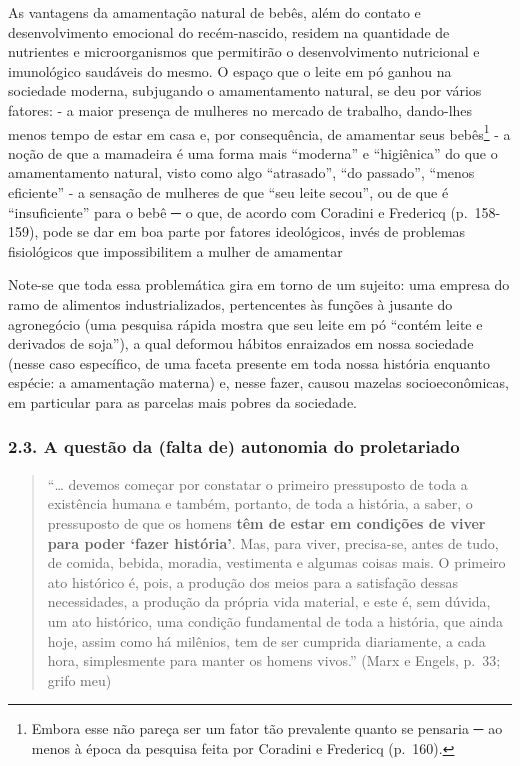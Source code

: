 \documentclass[12pt]{article}
\numberwithin{equation}{section}
\theoremstyle{plain}
\theoremstyle{definition}
\theoremstyle{remark}
\begin{document}
As vantagens da amamentação natural de bebês, além do contato e desenvolvimento emocional do recém-nascido, residem na quantidade de nutrientes e microorganismos que permitirão o desenvolvimento nutricional e imunológico saudáveis do mesmo. O espaço que o leite em pó ganhou na sociedade moderna, subjugando o amamentamento natural, se deu por vários fatores: - a maior presença de mulheres no mercado de trabalho, dando-lhes menos tempo de estar em casa e, por consequência, de amamentar seus bebês\footnote{Embora esse não pareça ser um fator tão prevalente quanto se pensaria ─ ao menos à época da pesquisa feita por Coradini e Fredericq (p.~160).} - a noção de que a mamadeira é uma forma mais ``moderna'' e ``higiênica'' do que o amamentamento natural, visto como algo ``atrasado'', ``do passado'', ``menos eficiente'' - a sensação de mulheres de que ``seu leite secou'', ou de que é ``insuficiente'' para o bebê ─ o que, de acordo com Coradini e Fredericq (p.~158-159), pode se dar em boa parte por fatores ideológicos, invés de problemas fisiológicos que impossibilitem a mulher de amamentar

Note-se que toda essa problemática gira em torno de um sujeito: uma empresa do ramo de alimentos industrializados, pertencentes às funções à jusante do agronegócio (uma pesquisa rápida mostra que seu leite em pó ``contém leite e derivados de soja''), a qual deformou hábitos enraizados em nossa sociedade (nesse caso específico, de uma faceta presente em toda nossa história enquanto espécie: a amamentação materna) e, nesse fazer, causou mazelas socioeconômicas, em particular para as parcelas mais pobres da sociedade.

\hypertarget{a-questuxe3o-da-falta-de-autonomia-do-proletariado}{%
\subsubsection{2.3. A questão da (falta de) autonomia do proletariado}\label{a-questuxe3o-da-falta-de-autonomia-do-proletariado}}

\begin{quote}
``\ldots{} devemos começar por constatar o primeiro pressuposto de toda a existência humana e também, portanto, de toda a história, a saber, o pressuposto de que os homens \textbf{têm de estar em condições de viver para poder `fazer história'}. Mas, para viver, precisa-se, antes de tudo, de comida, bebida, moradia, vestimenta e algumas coisas mais. O primeiro ato histórico é, pois, a produção dos meios para a satisfação dessas necessidades, a produção da própria vida material, e este é, sem dúvida, um ato histórico, uma condição fundamental de toda a história, que ainda hoje, assim como há milênios, tem de ser cumprida diariamente, a cada hora, simplesmente para manter os homens vivos.'' (Marx e Engels, p.~33; grifo meu)
\end{quote}
\end{document}

